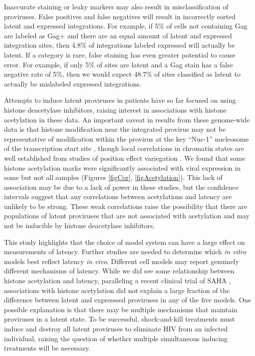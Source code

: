 \documentclass[../sherrill-Mix_thesis.tex]{subfiles}
\begin{document}
	Inaccurate staining or leaky markers may also result in misclassification of proviruses. False positives and false negatives will result in incorrectly sorted latent and expressed integrations. For example, if 5\% of cells not containing Gag are labeled as Gag+ and there are an equal amount of latent and expressed integration sites, then 4.8\% of integrations labeled expressed will actually be latent. If a category is rare, false staining has even greater potential to cause error. For example, if only 5\% of sites are latent and a Gag stain has a false negative rate of 5\%, then we would expect 48.7\% of sites classified as latent to actually be mislabeled expressed integrations.

	Attempts to induce latent proviruses in patients have so far focused on using histone deacetylase inhibitors, raising interest in associations with histone acetylation in these data. An important caveat in results from these genome-wide data is that histone modification near the integrated provirus may not be representative of modification within the provirus at the key ``Nuc-1'' nucleosome of the transcription start site \citep{Lint1996}, though local correlations in chromatin states are well established from studies of position effect variegation \citep{Muller1930,Gaszner2006}. We found that some histone acetylation marks were significantly associated with viral expression in some but not all samples (Figures \ref{figCor}, \ref{figAcetylation}). This lack of association may be due to a lack of power in these studies, but the confidence intervals suggest that any correlations between acetylations and latency are unlikely to be strong.  These weak correlations raise the possibility that there are populations of latent proviruses that are not associated with acetylation and may not be inducible by histone deacetylase inhibitors.


	This study highlights that the choice of model system can have a large effect on measurements of latency. Further studies are needed to determine which \textit{in vitro} models best reflect latency \textit{in vivo}. Different cell models may report genuinely different mechanisms of latency. While we did see some relationship between histone acetylation and latency, paralleling a recent clinical trial of SAHA \citep{Archin2012}, associations with histone acetylation did not explain a large fraction of the difference between latent and expresssed proviruses in any of the five models. One possible explanation is that there  may be multiple mechanisms that maintain proviruses in a latent state. To be successful, shock-and-kill treatments must induce and destroy all latent proviruses to eliminate HIV from an infected individual, raising the question of whether multiple simultaneous inducing treatments will be necessary. %
	
\end{document}
